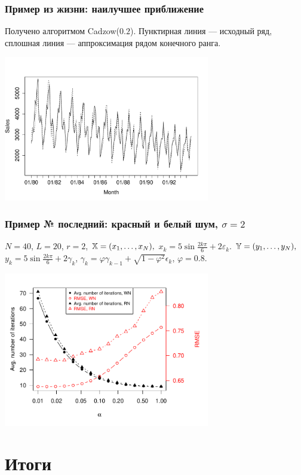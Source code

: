 \documentclass[unicode, notheorems]{beamer}
\begin{document}
\begin{frame}
	\frametitle{Пример из жизни: наилучшее приближение}
	Получено алгоритмом Cadzow($0.2$). Пунктирная линия --- исходный ряд, сплошная линия --- аппроксимация рядом конечного ранга.
	\vspace{-0.2cm}
	\begin{center}
		\includegraphics*[width = 9cm]{rlimage.pdf}
	\end{center}
\end{frame}

\begin{frame}
	\frametitle{Пример № последний: красный и белый шум, $\sigma = 2$}
	$N = 40$, $L = 20$, $r = 2$, $\mathbb{X} = (x_{1}, \ldots, x_N),$  $x_k = 5\sin{\frac{2 k \pi}{6}} + 2 \varepsilon_k$.
	$\mathbb{Y} = (y_{1}, \ldots, y_N),$  $y_k = 5\sin{\frac{2 k \pi}{6}} + 2 \gamma_k$, $\gamma_k = \varphi \gamma_{k - 1} + \sqrt{1 - \varphi^2} \epsilon_k$, $\varphi = 0.8$.
	\vspace{-0.4cm}
	\begin{center}
		\includegraphics*[width = 9cm]{2axis-2.pdf}
	\end{center}
\end{frame}

\section{Итоги}
\end{document}
